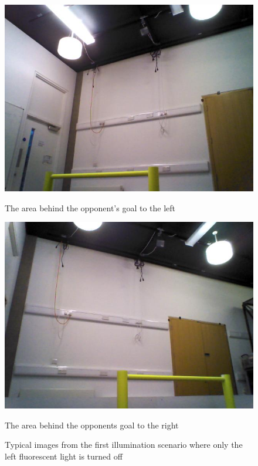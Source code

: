 \begin{figure}
\begin{minipage}[b]{0.5\linewidth}
\includegraphics[scale=0.3]{../Drawings/lighting/leftLight/3.jpg}
\caption{The area behind the opponent's goal to the left}
\label{fig:leftogleft}
\end{minipage}
\hspace{0.5cm}
\begin{minipage}[b]{0.5\linewidth}
\includegraphics[scale=0.3]{../Drawings/lighting/leftLight/4.jpg}
\caption{The area behind the opponents goal to the right}
\label{fig:leftogright}
\end{minipage}
\caption{Typical images from the first illumination scenario where only the left fluorescent light is turned off}
\end{figure}



